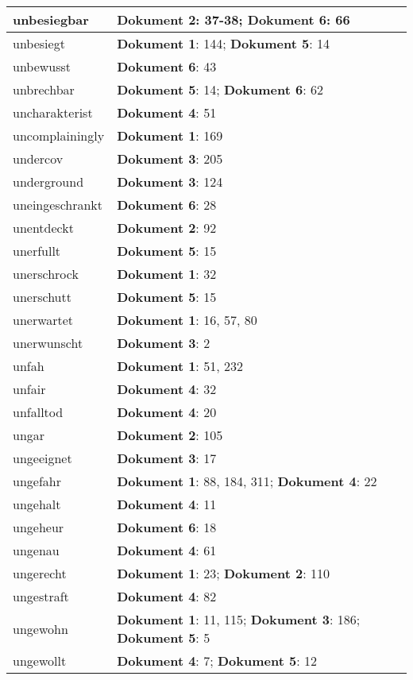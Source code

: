 \documentclass[a5paper]{article}
\begin{document}
\begin{longtable}[l]{|l|p{3in}|}
\hline
unbesiegbar & \textbf{Dokument 2}: 37-38; \textbf{Dokument 6}: 66 \\
\hline
unbesiegt & \textbf{Dokument 1}: 144; \textbf{Dokument 5}: 14 \\
\hline
unbewusst & \textbf{Dokument 6}: 43 \\
\hline
unbrechbar & \textbf{Dokument 5}: 14; \textbf{Dokument 6}: 62 \\
\hline
uncharakterist & \textbf{Dokument 4}: 51 \\
\hline
uncomplainingly & \textbf{Dokument 1}: 169 \\
\hline
undercov & \textbf{Dokument 3}: 205 \\
\hline
underground & \textbf{Dokument 3}: 124 \\
\hline
uneingeschrankt & \textbf{Dokument 6}: 28 \\
\hline
unentdeckt & \textbf{Dokument 2}: 92 \\
\hline
unerfullt & \textbf{Dokument 5}: 15 \\
\hline
unerschrock & \textbf{Dokument 1}: 32 \\
\hline
unerschutt & \textbf{Dokument 5}: 15 \\
\hline
unerwartet & \textbf{Dokument 1}: 16, 57, 80 \\
\hline
unerwunscht & \textbf{Dokument 3}: 2 \\
\hline
unfah & \textbf{Dokument 1}: 51, 232 \\
\hline
unfair & \textbf{Dokument 4}: 32 \\
\hline
unfalltod & \textbf{Dokument 4}: 20 \\
\hline
ungar & \textbf{Dokument 2}: 105 \\
\hline
ungeeignet & \textbf{Dokument 3}: 17 \\
\hline
ungefahr & \textbf{Dokument 1}: 88, 184, 311; \textbf{Dokument 4}: 22 \\
\hline
ungehalt & \textbf{Dokument 4}: 11 \\
\hline
ungeheur & \textbf{Dokument 6}: 18 \\
\hline
ungenau & \textbf{Dokument 4}: 61 \\
\hline
ungerecht & \textbf{Dokument 1}: 23; \textbf{Dokument 2}: 110 \\
\hline
ungestraft & \textbf{Dokument 4}: 82 \\
\hline
ungewohn & \textbf{Dokument 1}: 11, 115; \textbf{Dokument 3}: 186; \textbf{Dokument 5}: 5 \\
\hline
ungewollt & \textbf{Dokument 4}: 7; \textbf{Dokument 5}: 12 \\

\end{longtable}
\end{document}
